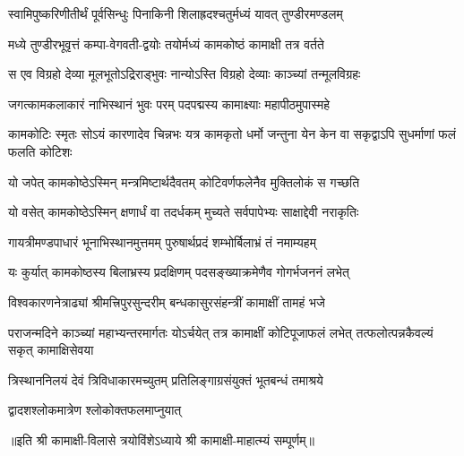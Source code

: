 

\twolineshloka
{स्वामिपुष्करिणीतीर्थं पूर्वसिन्धुः पिनाकिनी}
{शिलाह्रदश्चतुर्मध्यं यावत् तुण्डीरमण्डलम्}

\twolineshloka
{मध्ये तुण्डीरभूवृत्तं कम्पा-वेगवती-द्वयोः}
{तयोर्मध्यं कामकोष्ठं कामाक्षी तत्र वर्तते}

\twolineshloka
{स एव विग्रहो देव्या मूलभूतोऽद्रिराड्भुवः}
{नान्योऽस्ति विग्रहो देव्याः काञ्च्यां तन्मूलविग्रहः}

\twolineshloka
{जगत्कामकलाकारं नाभिस्थानं भुवः परम्}
{पदपद्मस्य कामाक्ष्याः महापीठमुपास्महे}

\threelineshloka
{कामकोटिः स्मृतः सोऽयं कारणादेव चिन्नभः}
{यत्र कामकृतो धर्मो जन्तुना येन केन वा}
{सकृद्वाऽपि सुधर्माणां फलं फलति कोटिशः}

\twolineshloka
{यो जपेत् कामकोष्ठेऽस्मिन् मन्त्रमिष्टार्थदैवतम्}
{कोटिवर्णफलेनैव मुक्तिलोकं स गच्छति}

\twolineshloka
{यो वसेत् कामकोष्ठेऽस्मिन् क्षणार्धं वा तदर्धकम्}
{मुच्यते सर्वपापेभ्यः साक्षाद्देवी नराकृतिः}

\twolineshloka
{गायत्रीमण्डपाधारं भूनाभिस्थानमुत्तमम्}
{पुरुषार्थप्रदं शम्भोर्बिलाभ्रं तं नमाम्यहम्}

\twolineshloka
{यः कुर्यात् कामकोष्ठस्य बिलाभ्रस्य प्रदक्षिणम्}
{पदसङ्ख्याक्रमेणैव गोगर्भजननं लभेत्}

\twolineshloka
{विश्वकारणनेत्राढ्यां श्रीमत्त्रिपुरसुन्दरीम्}
{बन्धकासुरसंहन्त्रीं कामाक्षीं तामहं भजे}

\threelineshloka
{पराजन्मदिने काञ्च्यां महाभ्यन्तरमार्गतः}
{योऽर्चयेत् तत्र कामाक्षीं कोटिपूजाफलं लभेत्}
{तत्फलोत्पन्नकैवल्यं सकृत् कामाक्षिसेवया}

\twolineshloka
{त्रिस्थाननिलयं देवं त्रिविधाकारमच्युतम्}
{प्रतिलिङ्गाग्रसंयुक्तं भूतबन्धं तमाश्रये}

{द्वादशश्लोकमात्रेण श्लोकोक्तफलमाप्नुयात्}

॥इति श्री कामाक्षी-विलासे त्रयोविंशेऽध्याये श्री कामाक्षी-माहात्म्यं सम्पूर्णम्॥